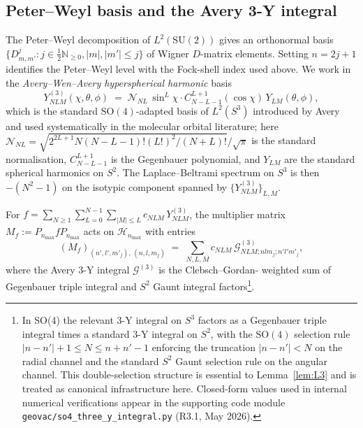 \documentclass[11pt,a4paper]{article}
\theoremstyle{plain}
\theoremstyle{definition}
\newcommand{\nmax}{n_{\max}}
\newcommand{\sthree}{S^{3}}
\newcommand{\Hilb}{\mathcal{H}}
\newcommand{\N}{\mathbb{N}}
\newcommand{\SU}{\mathrm{SU}}
\newcommand{\SO}{\mathrm{SO}}
\newcommand{\Mat}{M}
\begin{document}
\subsection{Peter--Weyl basis and the Avery 3-Y integral}
\label{sec:peter_weyl}

The Peter--Weyl decomposition of $L^2(\SU(2))$ gives an orthonormal
basis $\{D^j_{m, m'} : j \in \tfrac{1}{2}\N_{\ge 0}, |m|, |m'| \le j\}$
of Wigner $D$-matrix elements. Setting $n = 2j + 1$ identifies the
Peter--Weyl level with the Fock-shell index used above. We work in the
\emph{Avery--Wen--Avery hyperspherical harmonic} basis
\begin{equation}\label{eq:avery_y3}
   Y^{(3)}_{NLM}(\chi, \theta, \phi)
   \;=\; \mathcal{N}_{NL}\,\sin^L \chi \cdot
   C^{L+1}_{N - L - 1}(\cos \chi)\,Y_{LM}(\theta, \phi),
\end{equation}
which is the standard $\SO(4)$-adapted basis of $L^2(\sthree)$
introduced by Avery~\cite{avery_wen_avery1986} and used systematically
in the molecular orbital literature; here
$\mathcal{N}_{NL} = \sqrt{2^{2L+1} N (N-L-1)! (L!)^2 / (N+L)!}/\sqrt{\pi}$
is the standard normalisation, $C^{L+1}_{N-L-1}$ is the Gegenbauer
polynomial, and $Y_{LM}$ are the standard spherical harmonics on
$S^2$. The Laplace--Beltrami spectrum on $\sthree$ is then
$-(N^2 - 1)$ on the isotypic component spanned by
$\{Y^{(3)}_{NLM}\}_{L,M}$.

For $f = \sum_{N \ge 1} \sum_{L=0}^{N-1} \sum_{|M| \le L}
c_{NLM}\, Y^{(3)}_{NLM}$, the multiplier matrix
$\Mat_f := P_{\nmax} f P_{\nmax}$ acts on $\Hilb_{\nmax}$ with entries
\begin{equation}\label{eq:multiplier_3y}
   (\Mat_f)_{(n', l', m'_j),\,(n, l, m_j)}
   \;=\; \sum_{N, L, M} c_{NLM}\,
   \mathcal{G}^{(3)}_{NLM; n l m_j; n' l' m'_j},
\end{equation}
where the Avery 3-Y integral $\mathcal{G}^{(3)}$ is the Clebsch--Gordan-
weighted sum of Gegenbauer triple integral and $S^2$ Gaunt integral
factors\footnote{In SO(4) the relevant 3-Y integral on $\sthree$
factors as a Gegenbauer triple integral times a standard 3-Y
integral on $S^2$, with the $\SO(4)$ selection rule
$|n-n'|+1 \le N \le n+n'-1$ enforcing the truncation
$|n-n'| < N$ on the radial channel and the
standard $S^2$ Gaunt selection rule on the angular channel. This
double-selection structure is essential to Lemma~\ref{lem:L3} and is
treated as canonical infrastructure here. Closed-form values used in
internal numerical verifications appear in the supporting code module
\texttt{geovac/so4\_three\_y\_integral.py} (R3.1, May 2026).}.
\end{document}
